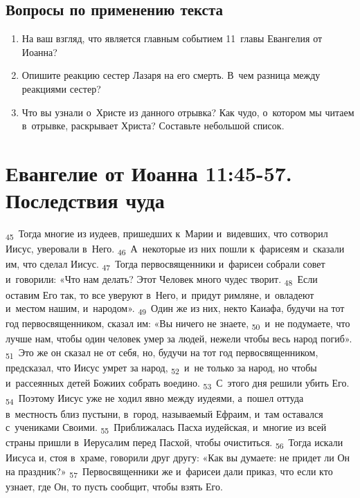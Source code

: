 \documentclass[a4paper,12pt]{article}
\begin{document}
\subsection*{Вопросы по применению текста} 
\begin{enumerate}
    \item На ваш взгляд, что является главным событием 11~главы Евангелия от Иоанна? 
    
    \myline
    
    \myline
    \item Опишите реакцию сестер Лазаря на его смерть. В~чем разница между реакциями сестер? 
    
    \myline
    
    \myline
    \item Что вы узнали о~Христе из данного отрывка? Как чудо, о~котором мы читаем в~отрывке, раскрывает Христа? Составьте небольшой список.
    
    \myline
    
    \myline
\end{enumerate}



\section{Евангелие от Иоанна 11:45-57. Последствия чуда}

\textsubscript{45}~Тогда многие из иудеев, пришедших к~Марии и~видевших, что сотворил Иисус, уверовали в~Него. \textsubscript{46}~А~некоторые из них пошли к~фарисеям и~сказали им, что сделал Иисус. \textsubscript{47}~Тогда первосвященники и~фарисеи собрали совет и~говорили: «Что нам делать? Этот Человек много чудес творит. \textsubscript{48}~Если оставим Его так, то все уверуют в~Него, и~придут римляне, и~овладеют и~местом нашим, и~народом». \textsubscript{49}~Один же из них, некто Каиафа, будучи на тот год первосвященником, сказал им: «Вы ничего не знаете, \textsubscript{50}~и~не подумаете, что лучше нам, чтобы один человек умер за людей, нежели чтобы весь народ погиб». \textsubscript{51}~Это же он сказал не от себя, но, будучи на тот год первосвященником, предсказал, что Иисус умрет за народ, \textsubscript{52}~и~не только за народ, но чтобы и~рассеянных детей Божиих собрать воедино. \textsubscript{53}~С~этого дня решили убить Его. \textsubscript{54}~Поэтому Иисус уже не ходил явно между иудеями, а~пошел оттуда в~местность близ пустыни, в~город, называемый Ефраим, и~там оставался с~учениками Своими. \textsubscript{55}~Приближалась Пасха иудейская, и~многие из всей страны пришли в~Иерусалим перед Пасхой, чтобы очиститься. \textsubscript{56}~Тогда искали Иисуса и, стоя в~храме, говорили друг другу: «Как вы думаете: не придет ли Он на праздник?» \textsubscript{57}~Первосвященники же и~фарисеи дали приказ, что если кто узнает, где Он, то пусть сообщит, чтобы взять Его. 
\end{document}
